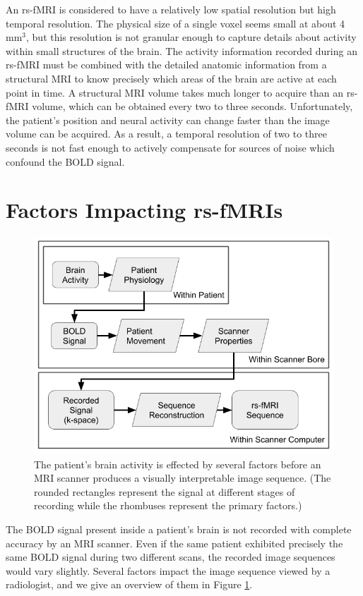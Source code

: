 An rs-fMRI is considered to have a relatively low spatial resolution but high temporal resolution. The physical size of a single voxel seems small at about 4 mm$^3$, but this resolution is not granular enough to capture details about activity within small structures of the brain. The activity information recorded during an rs-fMRI must be combined with the detailed anatomic information from a structural MRI to know precisely which areas of the brain are active at each point in time. A structural MRI volume takes much longer to acquire than an rs-fMRI volume, which can be obtained every two to three seconds. Unfortunately, the patient's position and neural activity can change faster than the image volume can be acquired. As a result, a temporal resolution of two to three seconds is not fast enough to actively compensate for sources of noise which confound the BOLD signal. 

\section{Factors Impacting rs-fMRIs}

\begin{figure}
\centering
\includegraphics[width=.6\textwidth]{2/rsfMRI-signal-filters.png}
\caption{The patient's brain activity is effected by several factors before an MRI scanner produces a visually interpretable image sequence. (The rounded rectangles represent the signal at different stages of recording while the rhombuses represent the primary factors.)}
\label{ch2:fig:signal-filters}
\end{figure}

The BOLD signal present inside a patient's brain is not recorded with complete accuracy by an MRI scanner. Even if the same patient exhibited precisely the same BOLD signal during two different scans, the recorded image sequences would vary slightly. Several factors impact the image sequence viewed by a radiologist, and we give an overview of them in Figure \ref{ch2:fig:signal-filters}. 

